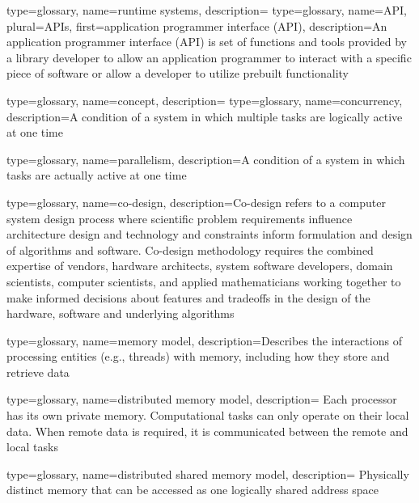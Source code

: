 {
  type=glossary,
  name={runtime systems},
  description={}
}
{
  type=glossary,
  name={API},
  plural={APIs},
  first={application programmer interface (API)},
  description={An application programmer interface (API) is set of functions and tools provided by a library developer to allow an application programmer to interact with a specific piece of software or allow a developer to utilize prebuilt functionality}
}

{
  type=glossary,
  name={concept},
  description={}
}
{
  type=glossary,
  name={concurrency},
  description={A condition of a system in which multiple tasks are logically
    active at one time}
}

{
  type=glossary,
  name={parallelism},
  description={A condition of a system in which tasks are actually active at
    one time}
}

{
  type=glossary,
  name=co-design,
  description={Co-design refers to a computer system design process where
    scientific problem requirements influence architecture design and
      technology and constraints inform formulation and design of algorithms
      and software.  Co-design methodology requires the combined expertise of
      vendors, hardware architects, system software developers, domain
      scientists, computer scientists, and applied mathematicians working
      together to make informed decisions about features and tradeoffs in the
      design of the hardware, software and underlying
      algorithms~\cite{co-design}}
}

{
  type=glossary,
  name={memory model},
  description={Describes the interactions of processing entities (e.g.,
      threads) with memory, including how they store and retrieve data}
}

{
  type=glossary,
  name={distributed memory model},
  description={ Each processor has its own private memory. 
     Computational tasks can only operate on their local data. When remote data
     is required, it is communicated between the remote and local tasks}
}

{
  type=glossary,
  name={distributed shared memory model},
  description={ Physically distinct memory that can be accessed as one
    logically shared address space}
}

